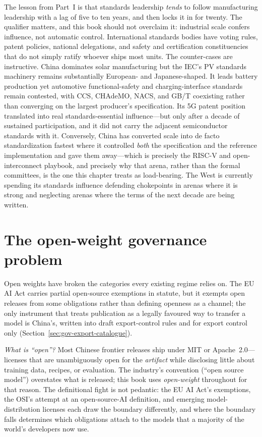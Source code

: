 The lesson from Part~I is that standards leadership \emph{tends} to follow manufacturing leadership with a lag of five to ten years, and then locks it in for twenty. The qualifier matters, and this book should not overclaim it: industrial scale confers influence, not automatic control. International standards bodies have voting rules, patent policies, national delegations, and safety and certification constituencies that do not simply ratify whoever ships most units. The counter-cases are instructive. China dominates solar manufacturing but the IEC's PV standards machinery remains substantially European- and Japanese-shaped. It leads battery production yet automotive functional-safety and charging-interface standards remain contested, with CCS, CHAdeMO, NACS, and GB/T coexisting rather than converging on the largest producer's specification. Its 5G patent position translated into real standards-essential influence---but only after a decade of sustained participation, and it did not carry the adjacent semiconductor standards with it. Conversely, China has converted scale into de facto standardization fastest where it controlled \emph{both} the specification and the reference implementation and gave them away---which is precisely the RISC-V and open-interconnect playbook, and precisely why that arena, rather than the formal committees, is the one this chapter treats as load-bearing. The West is currently spending its standards influence defending chokepoints in arenas where it is strong and neglecting arenas where the terms of the next decade are being written.

\section{The open-weight governance problem}

Open weights have broken the categories every existing regime relies on. The EU AI Act carries partial open-source exemptions in statute, but it exempts open releases from some obligations rather than defining openness as a channel; the only instrument that treats publication as a legally favoured way to transfer a model is China's, written into draft export-control rules and for export control only (Section~\ref{sec:gov-export-catalogue}).

\emph{What is ``open''?} Most Chinese frontier releases ship under MIT or Apache~2.0---licenses that are unambiguously open for the \emph{artifact} while disclosing little about training data, recipes, or evaluation. The industry's convention (``open source model'') overstates what is released; this book uses \emph{open-weight} throughout for that reason. The definitional fight is not pedantic: the EU AI Act's exemptions, the OSI's attempt at an open-source-AI definition, and emerging model-distribution licenses each draw the boundary differently, and where the boundary falls determines which obligations attach to the models that a majority of the world's developers now use.

